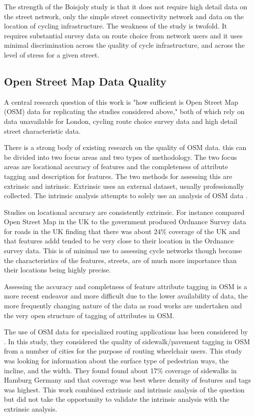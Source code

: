 The strength of the Boisjoly study is that it does not require high detail data on the street network, only the simple street connectivity network and data on the location of cycling infrastructure. The weakness of the study is twofold. It requires substantial survey data on route choice from network users and it uses minimal discrimination across the quality of cycle infrastructure, and across the level of stress for a given street. 

\subsection{Open Street Map Data Quality}

A central research question of this work is "how sufficient is Open Street Map (OSM) data for replicating the studies considered above," both of which rely on data unavailable for London, cycling route choice survey data and high detail street characteristic data. 

There is a strong body of existing research on the quality of OSM data. this can be divided into two focus areas and two types of methodology. The two focus areas are locational accuracy of features and the completeness of attribute tagging and description for features. The two methods for assessing this are extrinsic and intrinsic. Extrinsic uses an external dataset, usually professionally collected. The intrinsic analysis attempts to solely use an analysis of OSM data . 

Studies on locational accuracy are consistently extrinsic. For instance \cite{haklay2010good} compared Open Street Map in the UK to the government produced Ordnance Survey data for roads in the UK finding that there was about 24\% coverage of the UK and that features addd tended to be very close to their location in the Ordnance survey data. This is of minimal use to assessing cycle networks though because the characteristics of the features, streets, are of much more importance than their locations being highly precise. 

Assessing the accuracy and completness of feature attribute tagging in OSM is a more recent endeavor and more difficult due to the lower availability of data, the more frequently changing nature of the data as road works are undertaken and the very open structure of tagging of attributes in OSM.  

The use of OSM data for specialized routing applications has been considered by \cite{mobasheri2017crowdsourced}. In this study, they considered the quality of sidewalk/pavement tagging in OSM from a number of cities for the purpose of routing wheelchair users. This study was looking for information about the surface type of pedestrian ways, the incline, and the width. They found found about 17\% coverage of sidewalks in Hamburg Germany and that coverage was best where density of features and tags was highest. This work combined extrinsic and intrinsic analysis of the question but did not take the opportunity to validate the intrinsic analysis with the extrinsic analysis. 

